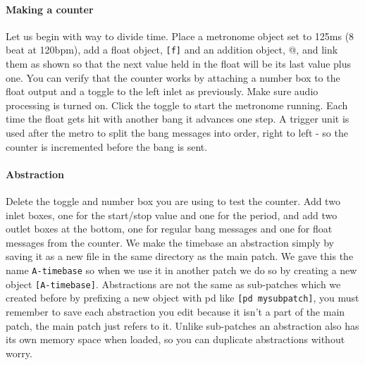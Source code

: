 \paragraph{Making a counter}
Let us begin with way to divide time. Place a metronome object set to 125ms (8 beat at 120bpm), add a float
object, \verb+[f]+ and an addition object, \verb@[+]@, and link them as shown so
that the next value held in the float will be its last value plus
one. You can verify that the counter works by attaching a number box
to the float output and a toggle to the left inlet as previously.
Make sure audio processing is turned on. Click the toggle to start the metronome running. Each time the float
gets hit with another bang it advances one step. A trigger unit is
used after the metro to split the bang messages into order, right
to left - so the counter is incremented before the bang is sent. 

\paragraph{Abstraction}
Delete the toggle and number box you are using to test the counter. Add two inlet boxes, one for
the start/stop value and one for the period, and add two outlet boxes at the bottom, one for
regular bang messages and one for float messages from the counter.
We make the timebase an abstraction simply by saving it as a new file in the same
directory as the main patch. We gave this the name \verb+A-timebase+ so when
we use it in another patch we do so by creating a new object \verb+[A-timebase]+.
Abstractions are not the same as sub-patches which we created before by prefixing
a new object with pd like \verb+[pd mysubpatch]+, you must remember to save each abstraction
you edit because it isn't a part of the main patch, the main patch just refers to it.
Unlike sub-patches an abstraction also has its own memory space when loaded, so you can
duplicate abstractions without worry. 
 
